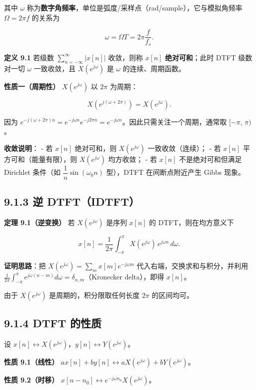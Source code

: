 其中 \(\omega\)
称为\textbf{数字角频率}，单位是弧度/采样点（rad/sample），它与模拟角频率
\(\Omega=2\pi f\) 的关系为

\[
\omega = \Omega T = 2\pi \frac{f}{f_s}.
\]

\textbf{定义 9.1} 若级数 \(\sum_{n=-\infty}^{\infty} |x[n]|\) 收敛，则称
\(x[n]\) \textbf{绝对可和}；此时 DTFT 级数对一切 \(\omega\) 一致收敛，且
\(X(e^{j\omega})\) 是 \(\omega\) 的连续、周期函数。

\textbf{性质一（周期性）} \(X(e^{j\omega})\) 以 \(2\pi\) 为周期：

\[
X(e^{j(\omega+2\pi)}) = X(e^{j\omega}).
\]

因为
\(e^{-j(\omega+2\pi)n}=e^{-j\omega n}e^{-j2\pi n}=e^{-j\omega n}\)。因此只需关注一个周期，通常取
\([-\pi,\,\pi)\)。

\textbf{收敛说明}： - 若 \(x[n]\) 绝对可和，则 \(X(e^{j\omega})\)
一致收敛（连续）； - 若 \(x[n]\) 平方可和（能量有限），则
\(X(e^{j\omega})\) 均方收敛； - 若 \(x[n]\) 不是绝对可和但满足 Dirichlet
条件（如 \(\dfrac{1}{n}\sin(\omega_0 n)\) 型），DTFT 在间断点附近产生
Gibbs 现象。

\subsection{9.1.3 逆 DTFT（IDTFT）}\label{ux9006-dtftidtft}

\textbf{定理 9.1（逆变换）} 若 \(X(e^{j\omega})\) 是序列 \(x[n]\) 的
DTFT，则在均方意义下

\[
x[n] = \frac{1}{2\pi}\int_{-\pi}^{\pi} X(e^{j\omega})\,e^{j\omega n}\,d\omega .
\]

\textbf{证明思路}：把 \(X(e^{j\omega})=\sum_m x[m]e^{-j\omega m}\)
代入右端，交换求和与积分，并利用
\(\frac{1}{2\pi}\int_{-\pi}^{\pi} e^{j\omega(n-m)}d\omega = \delta_{n,m}\)（Kronecker
delta），即得 \(x[n]\)。

由于 \(X(e^{j\omega})\) 是周期的，积分限取任何长度 \(2\pi\) 的区间均可。

\subsection{9.1.4 DTFT 的性质}\label{dtft-ux7684ux6027ux8d28}

设
\(x[n]\leftrightarrow X(e^{j\omega})\)，\(y[n]\leftrightarrow Y(e^{j\omega})\)。

\textbf{性质 9.1（线性）}
\(a x[n]+b y[n]\leftrightarrow a X(e^{j\omega})+b Y(e^{j\omega})\)。

\textbf{性质 9.2（时移）}
\(x[n-n_0]\leftrightarrow e^{-j\omega n_0}X(e^{j\omega})\)。

